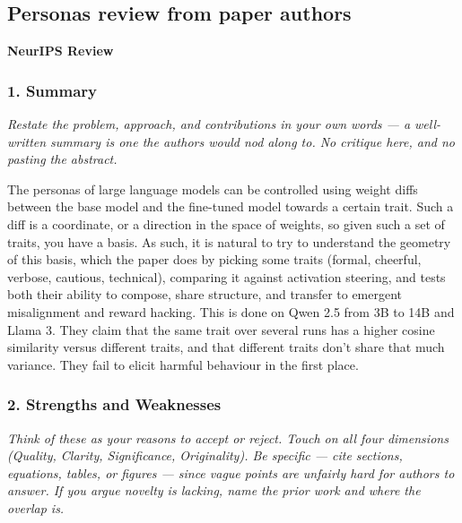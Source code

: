 \subsection{Personas review from paper authors}

\textbf{NeurIPS Review}

\subsubsection*{1. Summary}
{\itshape Restate the problem, approach, and contributions in your own words
--- a well-written summary is one the authors would nod along to. No critique
here, and no pasting the abstract.}

The personas of large language models can be controlled using weight diffs
between the base model and the fine-tuned model towards a certain trait. Such a
diff is a coordinate, or a direction in the space of weights, so given such a
set of traits, you have a basis. As such, it is natural to try to understand
the geometry of this basis, which the paper does by picking some traits
(formal, cheerful, verbose, cautious, technical), comparing it against
activation steering, and tests both their ability to compose, share structure,
and transfer to emergent misalignment and reward hacking. This is done on Qwen
2.5 from 3B to 14B and Llama 3. They claim that the same trait over several
runs has a higher cosine similarity versus different traits, and that different
traits don't share that much variance. They fail to elicit harmful behaviour in
the first place.

\subsubsection*{2. Strengths and Weaknesses}
{\itshape Think of these as your reasons to accept or reject. Touch on all four
dimensions (Quality, Clarity, Significance, Originality). Be specific --- cite
sections, equations, tables, or figures --- since vague points are unfairly
hard for authors to answer. If you argue novelty is lacking, name the prior
work and where the overlap is.}

